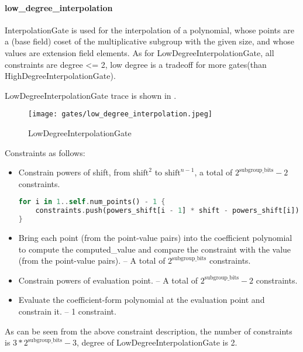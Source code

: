 \paragraph{low\_degree\_interpolation}

\hspace*{\fill}

\indent InterpolationGate is used for the interpolation of a polynomial, whose points are a (base field) coset of the multiplicative subgroup 
with the given size, and whose values are extension field elements. As for LowDegreeInterpolationGate,  all constraints are degree <= 2, 
low degree is a tradeoff for more gates(than HighDegreeInterpolationGate).

LowDegreeInterpolationGate trace is shown in .

\begin{figure}[!ht]
    \centering
    \texttt{[image: gates/low\_degree\_interpolation.jpeg]}
    \caption{LowDegreeInterpolationGate}
    \label{fig:low-degree-interpolation}
\end{figure}

Constraints as follows:
\begin{itemize}
    \item Constrain powers of shift, from $\text{shift}^2$ to $\text{shift}^{n-1}$, a total of $2^{\text{subgroup\_bits}}-2$ constraints.
    \begin{lstlisting}[language=rust]
for i in 1..self.num_points() - 1 {
    constraints.push(powers_shift[i - 1] * shift - powers_shift[i]);
}
    \end{lstlisting}
    \item Bring each point (from the point-value pairs) into the coefficient polynomial to compute the computed\_value 
    and compare the constraint with the value (from the point-value pairs). -- A total of $2^{\text{subgroup\_bits}}$ constraints.
    \item Constrain powers of evaluation point. -- A total of $2^{\text{subgroup\_bits}}-2$ constraints.
    \item Evaluate the coefficient-form polynomial at the evaluation point and constrain it. -- 1 constraint.
\end{itemize}

As can be seen from the above constraint description, the number of constraints is $3*2^{\text{subgroup\_bits}}-3$, degree of LowDegreeInterpolationGate is 2.
